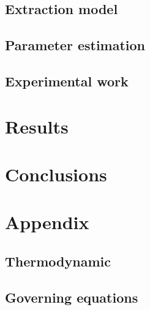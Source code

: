 \documentclass[a4paper,fleqn]{cas-dc}
\begin{document}
\subsection{Extraction model} \label{CH: Extraction_model}


%

\subsection{Parameter estimation} \label{CH: Parameter_estimation}


\subsection{Experimental work}


\section{Results}


\section{Conclusions}

\clearpage
%



\clearpage \appendix \label{appendix}
\section{Appendix} 
\subsection{Thermodynamic}

\subsection{Governing equations}

\end{document}
